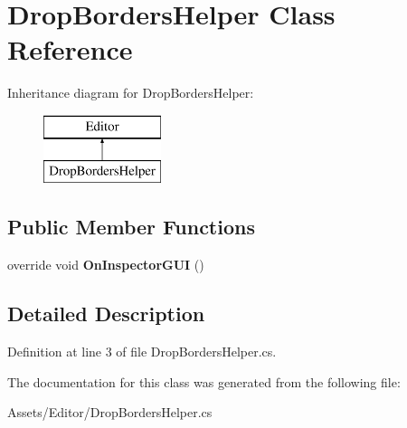 \hypertarget{class_drop_borders_helper}{\section{Drop\+Borders\+Helper Class Reference}
\label{class_drop_borders_helper}
}
Inheritance diagram for Drop\+Borders\+Helper\+:\begin{figure}[H]
\begin{center}
\leavevmode
\includegraphics[height=2.000000cm]{class_drop_borders_helper}
\end{center}
\end{figure}
\subsection*{Public Member Functions}
\begin{DoxyCompactItemize}
\item 
\hypertarget{class_drop_borders_helper_aa70c22fe0e8357fccea8455a791affb6}{override void {\bfseries On\+Inspector\+G\+U\+I} ()}\label{class_drop_borders_helper_aa70c22fe0e8357fccea8455a791affb6}

\end{DoxyCompactItemize}


\subsection{Detailed Description}


Definition at line 3 of file Drop\+Borders\+Helper.\+cs.



The documentation for this class was generated from the following file\+:\begin{DoxyCompactItemize}
\item 
Assets/\+Editor/Drop\+Borders\+Helper.\+cs\end{DoxyCompactItemize}
